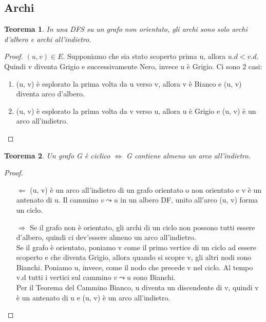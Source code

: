 \documentclass{article}
\newtheorem{theorem}{Teorema}[section]
\begin{document}
\subsection{Archi}

\begin{theorem}
    In una DFS su un grafo non orientato, gli archi sono solo archi d'albero e archi all'indietro.
\end{theorem}

\begin{proof}
    $(u, v) \in E$. Supponiamo che sia stato scoperto prima u, allora $u.d < v.d$. Quindi v diventa Grigio e successivamente Nero, invece u è Grigio. Ci sono 2 casi:
    \begin{enumerate}
        \item (u, v) è esplorato la prima volta da u verso v, allora v è Bianco e (u, v) diventa arco d'albero.
        \item (u, v) è esplorato la prima volta da v verso u, allora u è Grigio e (u, v) è un arco all'indietro.
    \end{enumerate}
\end{proof}

\begin{theorem}
    Un grafo G è ciclico $\Leftrightarrow$ G contiene almeno un arco all'indietro.
\end{theorem}

\begin{proof}
    $ $
    \begin{itemize}
        \item[$\Leftarrow$] (u, v) è un arco all'indietro di un grafo orientato o non orientato e v è un antenato di u. Il cammino $v \leadsto u$ in un albero DF, unito all'arco (u, v) forma un ciclo.
        \item[$\Rightarrow$] Se il grafo non è orientato, gli archi di un ciclo non possono tutti essere d'albero, quindi ci dev'essere almeno un arco all'indietro. \\
        Se il grafo è orientato, poniamo v come il primo vertice di un ciclo ad essere scoperto e che diventa Grigio, allora quando si scopre v, gli altri nodi sono Bianchi. Poniamo u, invece, come il nodo che precede v nel ciclo.
        Al tempo v.d tutti i vertici sul cammino $v \leadsto u$ sono Bianchi. \\
        Per il Teorema del Cammino Bianco, u diventa un discendente di v, quindi v è un antenato di u e (u, v) è un arco all'indietro. 
    \end{itemize}
\end{proof}
\end{document}

